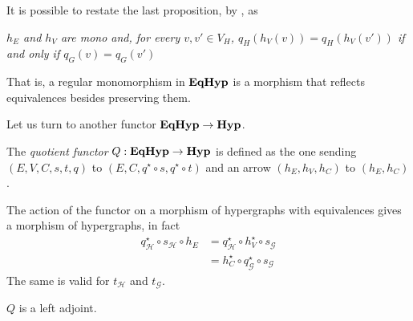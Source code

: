\begin{remark}
    It is possible to restate the last proposition, by , as 
    \begin{displayquote}
    \textit{$h_E$ and $h_V$ are mono and, for every $v, v'\in V_H$, $q_H(h_V(v))=q_H(h_V(v'))$ if and only if $q_G(v)=q_G(v')$}
    \end{displayquote}
    That is, a regular monomorphism in $\textbf{\textup{EqHyp}}$ is a morphism that reflects equivalences besides preserving them.
\end{remark}

Let us turn to another functor $\textbf{\textup{EqHyp}} \to \textbf{\textup{Hyp}}$.

\begin{definition}
The \emph{quotient functor} $Q:\textbf{\textup{EqHyp}}\to \textbf{\textup{Hyp}} $ is defined as
the one sending $(E, V, C, s, t, q)$ to $(E, C, q^{\star}\circ s, q^{\star}\circ t)$ and an arrow $(h_E, h_V, h_C)$ to $(h_E, h_C)$.
\end{definition}

\begin{remark}
	The action of the functor on a morphism of hypergraphs with equivalences gives a morphism of hypergraphs,
	in fact 
	\begin{align*}
		q^{\star}_\mathcal{H} \circ s_\mathcal{H} \circ h_E &= q^{\star}_\mathcal{H} \circ h_V^\star \circ s_\mathcal{G}\\ &= h_C^\star \circ q^{\star}_\mathcal{G} \circ s_\mathcal{G}
	\end{align*}
	The same is valid for $t_\mathcal{H}$ and $t_\mathcal{G}$. 
\end{remark}

\begin{lemma}\label{lemma:quot_funct_left_adj}
    $Q$ is a left adjoint.
\end{lemma}

